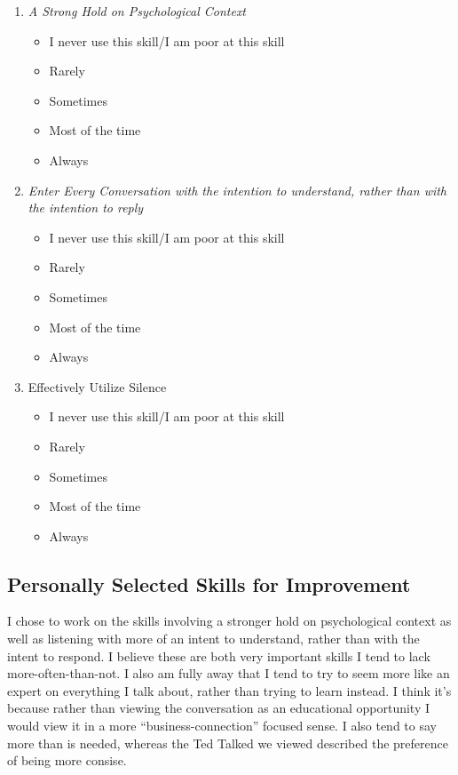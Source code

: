 \documentclass[stu,12pt]{apa7}
\begin{document}
      \begin{enumerate}
        \item \textit{A Strong Hold on Psychological Context}
          \begin{itemize}
            \item[\XSolidBrush] I never use this skill/I am poor at this skill
            \item[\XSolidBrush] Rarely
            \item[\XSolidBrush] Sometimes
            \item[\CheckmarkBold] Most of the time
            \item[\XSolidBrush] Always
          \end{itemize}
        \item \textit{%
          Enter Every Conversation with the intention to understand, rather %
            than with the intention to reply%
        }
          \begin{itemize}
            \item[\XSolidBrush] I never use this skill/I am poor at this skill
            \item[\CheckmarkBold] Rarely
            \item[\XSolidBrush] Sometimes
            \item[\XSolidBrush] Most of the time
            \item[\XSolidBrush] Always
          \end{itemize}
        \item Effectively Utilize Silence
          \begin{itemize}
            \item[\XSolidBrush] I never use this skill/I am poor at this skill
            \item[\XSolidBrush] Rarely
            \item[\CheckmarkBold] Sometimes
            \item[\XSolidBrush] Most of the time
            \item[\XSolidBrush] Always
          \end{itemize}
      \end{enumerate}

    \subsection{Personally Selected Skills for Improvement}
      I chose to work on the skills involving a stronger hold on psychological
        context as well as listening with more of an intent to understand,
        rather than with the intent to respond. I believe these are both very
        important skills I tend to lack more-often-than-not. I also am fully
        away that I tend to try to seem more like an expert on everything I talk
        about, rather than trying to learn instead. I think it's because rather
        than viewing the conversation as an educational opportunity I would
        view it in a more ``business-connection'' focused sense. I also tend to
        say more than is needed, whereas the Ted Talked we viewed described the
        preference of being more consise.
\end{document}
